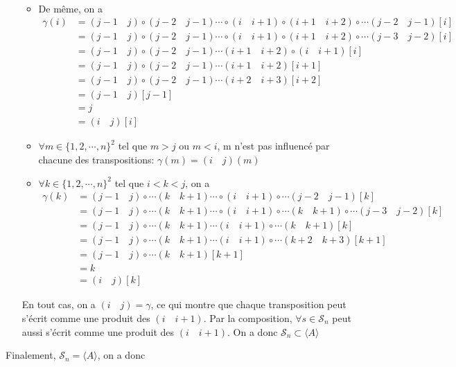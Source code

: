 \documentclass[a4paper,12pt]{book}
\begin{document}
\begin{itemize}
\begin{itemize}
\begin{align*}
              \end{align*}
              \item De même, on a 
              \begin{align*}
                \gamma(i)&=(j-1 \quad j)\circ (j-2 \quad j-1)\cdots\circ (i\quad i+1)\circ (i+1\quad i+2)\circ\cdots(j-2 \quad j-1)[i]\\
                         &=(j-1 \quad j)\circ (j-2 \quad j-1)\cdots\circ (i\quad i+1)\circ (i+1\quad i+2)\circ\cdots(j-3 \quad j-2)[i]\\
                         &=(j-1 \quad j)\circ (j-2 \quad j-1)\cdots(i+1\quad i+2)\circ (i\quad i+1)[i]\\
                         &=(j-1 \quad j)\circ (j-2 \quad j-1)\cdots(i+1\quad i+2)[i+1]\\
                         &=(j-1 \quad j)\circ (j-2 \quad j-1)\cdots(i+2\quad i+3)[i+2]\\
                         &=(j-1 \quad j)[j-1]\\
                         &=j\\
                         &=(i\quad j)[i]
              \end{align*}
              \item $\forall m\in \{1,2,\cdots,n\}^2$ tel que $m>j$ ou $m<i$, m n'est pas influencé par chacune des transpositions: $\gamma(m)=(i\quad j)(m)$
              \item $\forall k\in \{1,2,\cdots,n\}^2$ tel que $i<k<j$, on a 
              \begin{align*}
                \gamma(k)&=(j-1 \quad j)\circ \cdots(k\quad k+1)\cdots\circ (i\quad i+1)\circ\cdots(j-2 \quad j-1)[k]\\
                         &=(j-1 \quad j)\circ \cdots(k\quad k+1)\cdots\circ (i\quad i+1)\circ \cdots(k\quad k+1)\circ\cdots(j-3 \quad j-2)[k]\\
                         &=(j-1 \quad j)\circ \cdots(k\quad k+1)\cdots(i\quad i+1)\circ \cdots(k\quad k+1)[k]\\
                         &=(j-1 \quad j)\circ \cdots(k\quad k+1)\cdots(i\quad i+1)\circ \cdots(k+2\quad k+3)[k+1]\\
                         &=(j-1 \quad j)\circ \cdots(k\quad k+1)[k+1]\\
                         &=k\\
                         &=(i\quad j)[k]
              \end{align*}
          \end{itemize}
          En tout cas, on a $(i\quad j)=\gamma$, ce qui montre que chaque transposition peut s'écrit comme une produit des $(i\quad i+1)$. Par la composition, 
          $\forall s \in \mathscr{S}_n$ peut aussi s'écrit comme une produit des $(i\quad i+1)$. On a donc $\mathscr{S}_n \subset \langle A\rangle$
\end{itemize}
Finalement, $\mathscr{S}_n = \langle A\rangle$, on a donc 
\end{document}
